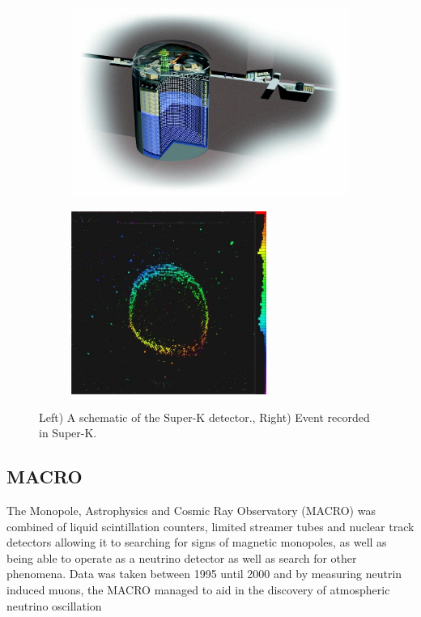 \begin{figure}[h!]
\centering
\begin{subfigure}{.5\textwidth}
  \centering
\includegraphics[width=\textwidth]{figures/SK3D.jpg}
\vspace{2mm}
\end{subfigure}%
\begin{subfigure}{.5\textwidth}
  \centering
\includegraphics[width=0.7\textwidth]{figures/SuperKMuon-300x282.jpg}
\vspace{2mm}
\end{subfigure}
\vspace{2mm}
\caption{Left) A schematic of the Super-K detector., Right) Event recorded in Super-K.}
\label{fig:SK}
\end{figure}

\subsection{MACRO}
The Monopole, Astrophysics and Cosmic Ray Observatory (MACRO) was combined of liquid scintillation counters, limited streamer tubes and nuclear track detectors allowing it to searching for signs of magnetic monopoles, as well as being able to operate as a neutrino detector as well as search for other phenomena. Data was taken between 1995 until 2000 and by measuring neutrin induced muons, the MACRO managed to aid in the discovery of atmospheric neutrino oscillation~\cite{62MACRO}

